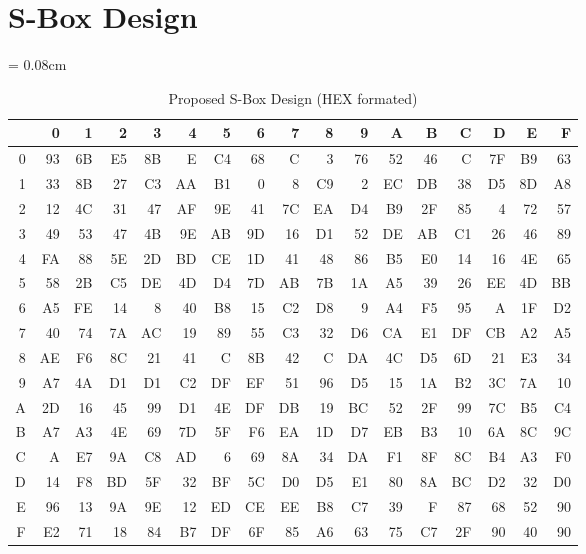 \documentclass[a4paper]{article}
\begin{document}
    \section{S-Box Design}
\begin{table}[h]
    \tabcolsep = 0.08cm
    \begin{tabular}{|r|rrrrrrrrrrrrrrrr|}
	\hline
	 & 0 & 1 & 2 & 3 & 4 & 5 & 6 & 7 & 8 & 9 & A & B & C & D & E & F \\ \hline
	 0 & 93 & 6B & E5 & 8B & E & C4 & 68 & C & 3 & 76 & 52 & 46 & C & 7F & B9 & 63 \\ 
	 1 & 33 & 8B & 27 & C3 & AA & B1 & 0 & 8 & C9 & 2 & EC & DB & 38 & D5 & 8D & A8 \\ 
	 2 & 12 & 4C & 31 & 47 & AF & 9E & 41 & 7C & EA & D4 & B9 & 2F & 85 & 4 & 72 & 57 \\ 
	 3 & 49 & 53 & 47 & 4B & 9E & AB & 9D & 16 & D1 & 52 & DE & AB & C1 & 26 & 46 & 89 \\ 
	 4 & FA & 88 & 5E & 2D & BD & CE & 1D & 41 & 48 & 86 & B5 & E0 & 14 & 16 & 4E & 65 \\ 
	 5 & 58 & 2B & C5 & DE & 4D & D4 & 7D & AB & 7B & 1A & A5 & 39 & 26 & EE & 4D & BB \\ 
	 6 & A5 & FE & 14 & 8 & 40 & B8 & 15 & C2 & D8 & 9 & A4 & F5 & 95 & A & 1F & D2 \\ 
	 7 & 40 & 74 & 7A & AC & 19 & 89 & 55 & C3 & 32 & D6 & CA & E1 & DF & CB & A2 & A5 \\ 
	 8 & AE & F6 & 8C & 21 & 41 & C & 8B & 42 & C & DA & 4C & D5 & 6D & 21 & E3 & 34 \\ 
	 9 & A7 & 4A & D1 & D1 & C2 & DF & EF & 51 & 96 & D5 & 15 & 1A & B2 & 3C & 7A & 10 \\ 
	 A & 2D & 16 & 45 & 99 & D1 & 4E & DF & DB & 19 & BC & 52 & 2F & 99 & 7C & B5 & C4 \\ 
	 B & A7 & A3 & 4E & 69 & 7D & 5F & F6 & EA & 1D & D7 & EB & B3 & 10 & 6A & 8C & 9C \\ 
	 C & A & E7 & 9A & C8 & AD & 6 & 69 & 8A & 34 & DA & F1 & 8F & 8C & B4 & A3 & F0 \\ 
	 D & 14 & F8 & BD & 5F & 32 & BF & 5C & D0 & D5 & E1 & 80 & 8A & BC & D2 & 32 & D0 \\ 
	 E & 96 & 13 & 9A & 9E & 12 & ED & CE & EE & B8 & C7 & 39 & F & 87 & 68 & 52 & 90 \\ 
	 F & E2 & 71 & 18 & 84 & B7 & DF & 6F & 85 & A6 & 63 & 75 & C7 & 2F & 90 & 40 & 90 \\ 
	 \hline
     \end{tabular}
     \caption{Proposed S-Box Design (HEX formated)}
     \label{sbox}
 \end{table}
\end{document}
